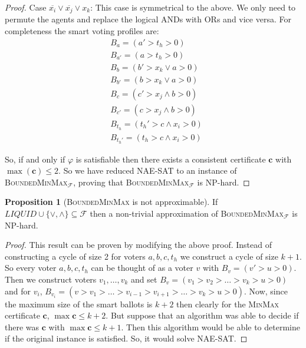 \documentclass[11pt,a4paper, titlepage]{article}
\theoremstyle{definition}
\newtheorem{proposition}[theorem]{Proposition}
\let\vec\mathbf
\begin{document}
\begin{proof}
    Case $\overline{x_i} \lor \overline{x_j} \lor x_k$: This case is symmetrical to the above. We only need to permute the agents and replace the logical ANDs with ORs and vice versa. For completeness the smart voting profiles are:     \begin{align*}
        &B_a = (a' > t_h > 0) \\
        &B_{a'} = (a > t_h > 0) \\
        &B_{b} = (b' > x_k \lor a > 0) \\
        &B_{b'} = (b > x_k \lor a > 0) \\
        &B_{c} = (c' > x_j \land b > 0) \\
        &B_{c'} = (c > x_j \land b > 0) \\
        &B_{t_h} = (t_h' > c \land x_i > 0) \\
        &B_{t_h'} = (t_h > c \land x_i > 0)
    \end{align*}

    So, if and only if $\varphi$ is satisfiable then there exists a consistent certificate $\vec{c}$ with $\max(\vec{c}) \leq 2$. So we have reduced \textsc{NAE-SAT} to an instance of \textsc{BoundedMinMax}$_\mathcal{F}$, proving that \textsc{BoundedMinMax}$_\mathcal{F}$ is NP-hard.
\end{proof}



\begin{proposition}[\textsc{BoundedMinMax} is not approximable]
    If $\mathit{LIQUID} \cup \{\lor, \land\} \subseteq \mathcal{F}$ then a non-trivial approximation of \textsc{BoundedMinMax}$_\mathcal{F}$ is NP-hard.
\end{proposition}

\begin{proof}
    This result can be proven by modifying the above proof. Instead of constructing a cycle of size 2 for voters $a, b, c, t_h$ we construct a cycle of size $k + 1$. So every voter $a, b, c, t_h$ can be thought of as a voter $v$ with $B_v = (v' > u > 0)$. Then we construct voters $v_1, \ldots, v_k$ and set $B_v = (v_1 > v_2 > \ldots > v_k > u > 0)$ and for $v_i$, $B_{v_i} = (v > v_1 > \ldots > v_{i - 1} > v_{i+1} > \ldots > v_k > u > 0)$.
    Now, since the maximum size of the smart ballots is $k + 2$ then clearly for the \textsc{MinMax} certificate $\vec{c}$, $\max{\vec{c}} \leq k + 2$. 
    But suppose that an algorithm was able to decide if there was $\vec{c}$ with $\max{\vec{c}} \leq k + 1$. Then this algorithm would be able to determine if the original instance is satisfied. So, it would solve \textsc{NAE-SAT}.
\end{proof}
\end{document}
